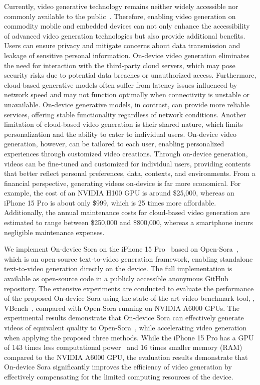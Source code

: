 Currently, video generative technology remains neither widely accessible nor commonly available to the public~\cite{liu2024sora}. Therefore, enabling video generation on commodity mobile and embedded devices can not only enhance the accessibility of advanced video generation technologies but also provide additional benefits. Users can ensure privacy and mitigate concerns about data transmission and leakage of sensitive personal information. On-device video generation eliminates the need for interaction with the third-party cloud servers, which may pose security risks due to potential data breaches or unauthorized access. Furthermore, cloud-based generative models often suffer from latency issues influenced by network speed and may not function optimally when connectivity is unstable or unavailable. On-device generative models, in contrast, can provide more reliable services, offering stable functionality regardless of network conditions. Another limitation of cloud-based video generation is their shared nature, which limits personalization and the ability to cater to individual users. On-device video generation, however, can be tailored to each user, enabling personalized experiences through customized video creations. Through on-device generation, videos can be fine-tuned and customized for individual users, providing contents that better reflect personal preferences, data, contexts, and environments. From a financial perspective, generating videos on-device is far more economical. For example, the cost of an NVIDIA H100 GPU is around \$25,000, whereas an iPhone 15 Pro is about only \$999, which is 25 times more affordable. Additionally, the annual maintenance costs for cloud-based video generation are estimated to range between \$250,000 and \$800,000, %
whereas a smartphone incurs negligible maintenance expenses.

We implement On-device Sora on the iPhone 15 Pro~\cite{apple2023} based on Open-Sora~\cite{opensora}, which is an open-source text-to-video generation framework, enabling standalone text-to-video generation directly on the device. The full implementation is available as open-source code in a publicly accessible anonymous GitHub repository. The extensive experiments are conducted to evaluate the performance of the proposed On-device Sora using the state-of-the-art video benchmark tool, \ie, VBench~\cite{huang2024vbench}, compared with Open-Sora running on NVIDIA A6000 GPUs. The experimental results demonstrate that On-device Sora can effectively generate videos of equivalent quality to Open-Sora~\cite{opensora}, while accelerating video generation when applying the proposed three methods. While the iPhone 15 Pro has a GPU of 143 times less computational power~\cite{apple2023} and 16 times smaller memory (RAM) compared to the NVIDIA A6000 GPU, the evaluation results demonstrate that On-device Sora significantly improves the efficiency of video generation by effectively compensating for the limited computing resources of the device.
\fi